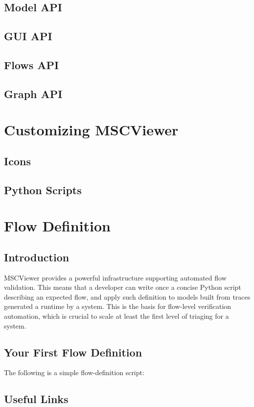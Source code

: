 \documentclass[11pt, twoside, titlepage]{book}
\newcommand{\prog}{MSCViewer}
\begin{document}
\section{Model API}



\section{GUI API}


\section{Flows API}


\section{Graph API}


\chapter{Customizing \prog}
\section{Icons}
\section{Python Scripts}

\chapter{Flow Definition}
\section{Introduction}
\prog{} provides a powerful infrastructure supporting automated flow validation.
This means that a developer can write once a concise Python script describing an expected flow,
and apply such definition to models built from traces generated a runtime by a system. This
is the basis for flow-level verification automation, which is crucial to scale at least the first
level of triaging for a system.

\section{Your First Flow Definition}
The following is a simple flow-definition script:


\appendix
\section{Useful Links}
\begin{tabular}{l l p{9.0cm}}

\end{tabular}
 
\printindex
\end{document}
